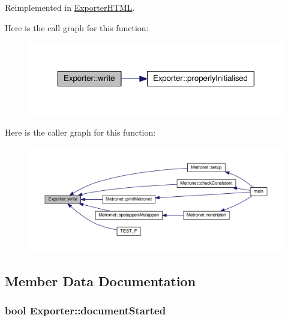 Reimplemented in \hyperlink{class_exporter_h_t_m_l_ace2649c240282289d4cb3bfbd19e427c}{Exporter\+H\+T\+ML}.



Here is the call graph for this function\+:
\nopagebreak
\begin{figure}[H]
\begin{center}
\leavevmode
\includegraphics[width=350pt]{class_exporter_ab3736803133eb727cf87a7306f91eb11_cgraph}
\end{center}
\end{figure}




Here is the caller graph for this function\+:
\nopagebreak
\begin{figure}[H]
\begin{center}
\leavevmode
\includegraphics[width=350pt]{class_exporter_ab3736803133eb727cf87a7306f91eb11_icgraph}
\end{center}
\end{figure}




\subsection{Member Data Documentation}
\subsubsection[{\texorpdfstring{document\+Started}{documentStarted}}]{\setlength{\rightskip}{0pt plus 5cm}bool Exporter\+::document\+Started\hspace{0.3cm}{\ttfamily [protected]}}\hypertarget{class_exporter_a7d55f6023d5fe983512f6b02fb60733b}{}\label{class_exporter_a7d55f6023d5fe983512f6b02fb60733b}
